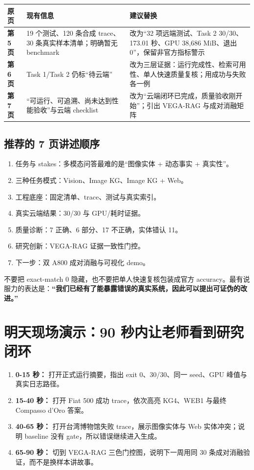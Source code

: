 \documentclass[11pt,a4paper]{ctexart}
\begin{document}
\begin{tabularx}{\textwidth}{>{\bfseries}p{17mm} p{52mm} X}
\toprule
原页 & 现有信息 & 建议替换 \\
\midrule
第 5 页 & 19 个测试、120 条合成 trace、30 条真实样本清单；明确暂无 benchmark & 改为“32 项远端测试、Task 2 30/30、173.01 秒、GPU 38,686 MiB、退出 0”，保留非官方指标警示 \\
第 6 页 & Task 1/Task 2 仍标“待云端” & 改为三层证据：运行完成性、检索可用性、单人快速质量复核；用成功与失败各一例 \\
第 7 页 & “可运行、可追溯、尚未达到性能验收”与云端 checklist & 改为“云端闭环已完成，质量验收刚开始”；引出 VEGA-RAG 与成对消融矩阵 \\
\bottomrule
\end{tabularx}

\subsection{推荐的 7 页讲述顺序}
\begin{enumerate}
  \item 任务与 stakes：多模态问答最难的是“图像实体 + 动态事实 + 真实性”。
  \item 三种任务模式：Vision、Image KG、Image KG + Web。
  \item 工程底座：固定清单、trace、测试与真实索引。
  \item 真实云端结果：30/30 与 GPU/耗时证据。
  \item 质量诊断：7 正确、6 部分、17 不正确，实体错认 11。
  \item 研究创新：VEGA-RAG 证据一致性门控。
  \item 下一步：双 A800 成对消融与可视化 demo。
\end{enumerate}

\begin{riskbox}
不要把 exact-match 0 隐藏，也不要把单人快速复核包装成官方 accuracy。最有说服力的表达是：\textbf{“我们已经有了能暴露错误的真实系统，因此可以提出可证伪的改进。”}
\end{riskbox}
\clearpage

\section{明天现场演示：90 秒内让老师看到研究闭环}

\begin{enumerate}
  \item \textbf{0-15 秒：} 打开正式运行摘要，指出 exit 0、30/30、同一 seed、GPU 峰值与真实日志路径。
  \item \textbf{15-40 秒：} 打开 Fiat 500 成功 trace，依次高亮 KG4、WEB1 与最终 Compasso d'Oro 答案。
  \item \textbf{40-65 秒：} 打开台湾博物馆失败 trace，展示图像实体与 Web 实体冲突；说明 baseline 没有 gate，所以错误继续进入生成。
  \item \textbf{65-90 秒：} 切到 VEGA-RAG 三色门控图，说明下一周用同 30 条成对消融验证，而不是换样本讲故事。
\end{enumerate}
\end{document}
